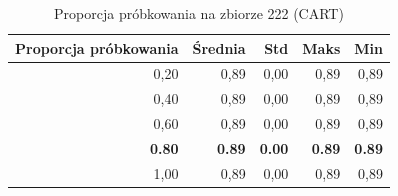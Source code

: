 \begin{table}[htbp]
\centering
\small
\setlength{\tabcolsep}{6pt}
\renewcommand{\arraystretch}{1.2}
\caption{Proporcja próbkowania na zbiorze 222 (CART)}
\label{tab:CART_sample_ratio_222}
\begin{tabular}{r|r|r|r|r}
\toprule
Proporcja próbkowania & Średnia & Std & Maks & Min \\
\hline
0,20 & 0,89 & 0,00 & 0,89 & 0,89 \\
0,40 & 0,89 & 0,00 & 0,89 & 0,89 \\
0,60 & 0,89 & 0,00 & 0,89 & 0,89 \\
\textbf{0.80} & \textbf{0.89} & \textbf{0.00} & \textbf{0.89} & \textbf{0.89} \\
1,00 & 0,89 & 0,00 & 0,89 & 0,89 \\
\bottomrule
\end{tabular}
\end{table}